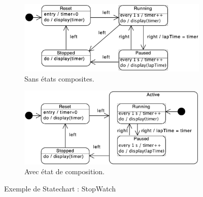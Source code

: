 \begin{figure}[H]
	\begin{subfigure}{0.5\textwidth}
		\includegraphics[width=\textwidth]{./Images/Diagrammes/diagram_statechart_ex_stopwatch_sansetatscomposites.png}
		\caption{Sans états composites.}
	\end{subfigure}
	\begin{subfigure}{0.5\textwidth}
		\includegraphics[width=\textwidth]{./Images/Diagrammes/diagram_statechart_ex_stopwatch_avecetatscomposites.png}
		\caption{Avec état de composition.}
	\end{subfigure}
	\caption{Exemple de Statechart : StopWatch}
\end{figure}